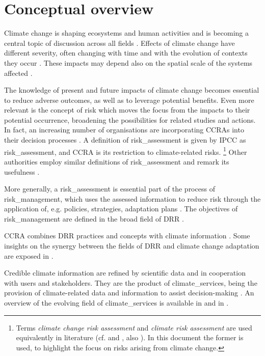\section{Conceptual overview}
\label{sec:Conceptual overview}
Climate change is shaping ecosystems and human activities and is becoming a central topic of discussion across all fields \cite{2022IPCCClimateChange,2022PortnerTechnicalSummary}. Effects of climate change have different severity, often changing with time and with the evolution of contexts they occur \cite{2024EEAExecutiveSummary}. These impacts may depend also on the spatial scale of the systems affected \cite{2021Doblas-ReyesLinkingGlobal}.

The knowledge of present and future impacts of climate change becomes essential to reduce adverse outcomes, as well as to leverage potential benefits. Even more relevant is the concept of risk which moves the focus from the impacts to their potential occurrence, broadening the possibilities for related studies and actions.
In fact, an increasing number of organisations are incorporating \glspl{CCRA} into their decision processes \cite{2024Carlin2024Climate}. A definition of \gls{risk_assessment} is given by \gls{IPCC} as \glsdesc{risk_assessment}, and \gls{CCRA} is its restriction to climate-related \glspl{risk}.%
\footnote{Terms \emph{climate change risk assessment} and \emph{climate risk assessment} are used equivalently in literature (cf. \cite[11]{2017GIZRiskSupplement} and \cite[20]{2017GIZTheVulnerability}, also \cite{2024LoyerInventoryOf}). In this document the former is used, to highlight the focus on risks arising from climate change.}
Other authorities employ similar definitions of \gls{risk_assessment} and remark its usefulness \cite{2021ISO14091,2019UNDRRGlobalAssessment}.

More generally, a \gls{risk_assessment} is essential part of the process of \gls{risk_management}, which uses the assessed information to reduce risk through the application of, e.g. policies, strategies, adaptation plans \cite{2018ISO31000}. The objectives of \gls{risk_management} are defined in the broad field of \gls{DRR} \cite{2016UNSecretary-GeneralReportOf}.

\Gls{CCRA} combines \gls{DRR} practices and concepts with climate information \cite{2017GIZRiskSupplement,2012FieldManagingThe}. Some insights on the synergy between the fields of \gls{DRR} and climate change adaptation are exposed in \cite[469-471]{2012FieldManagingThe}.

Credible climate information are refined by scientific data and in cooperation with users and stakeholders. They are the product of \glspl{climate_service}, being the provision of climate-related data and information to assist decision-making \cite{2012HewittTheGlobal}. An overview of the evolving field of \glspl{climate_service} is available in \cite[1431-1433]{2021Doblas-ReyesLinkingGlobal} and in \cite[1862-1869]{2021RanasingheClimateChange}.

